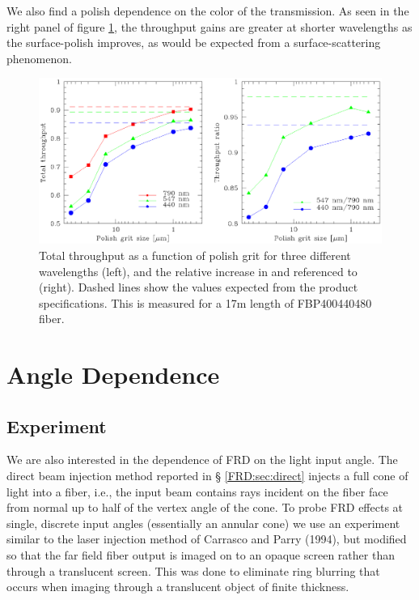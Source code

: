 We also find a polish dependence on the color of the transmission.  As
seen in the right panel of figure \ref{fig:tputwave}, the throughput
gains are greater at shorter wavelengths as the surface-polish
improves, as would be expected from a surface-scattering phenomenon.

\begin{figure}[ht]
  \centering
  \includegraphics[width=\textwidth, trim=0 4in 0 0, clip=true]{FRD/figs/tput.eps}
  \caption{\fixspacing\label{fig:tputwave} Total throughput as a function of
    polish grit for three different wavelengths (left), and the relative
    increase in \filtB and \filty referenced to \filtI (right). Dashed
    lines show the values expected from the product
    specifications. This is measured for a 17m length of FBP400440480
    fiber.}
\end{figure}

\section{Angle Dependence}
\label{FRD:sec:angle}
\subsection{Experiment}
We are also interested in the dependence of FRD on the light input
angle. The direct beam injection method reported in \S
\ref{FRD:sec:direct} injects a full cone of light into a fiber, i.e., 
the input beam contains rays incident on the fiber face from normal up
to half of the vertex angle of the cone.  To probe FRD effects at
single, discrete input angles (essentially an annular cone) we use an
experiment similar to the laser injection method of Carrasco and
Parry (1994)\cite{Carrasco, Haynes11}, but modified so that the far
field fiber output is imaged on to an opaque screen rather than through a
translucent screen. This was done to eliminate ring blurring that
occurs when imaging through a translucent object of finite thickness.

